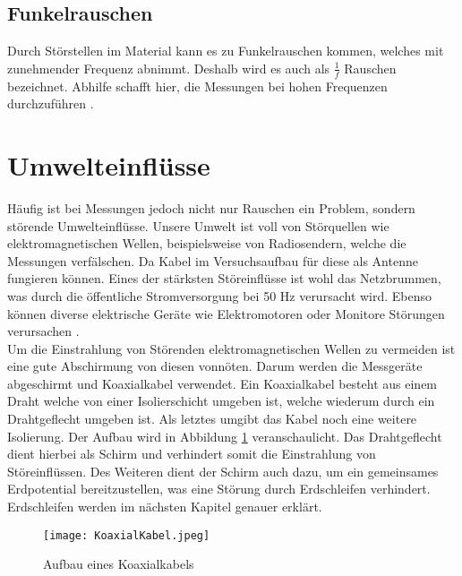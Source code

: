 \subsection{Funkelrauschen}
Durch Störstellen im Material kann es zu Funkelrauschen kommen, welches mit zunehmender Frequenz abnimmt. Deshalb wird es auch als $\frac{1}{f}$ Rauschen bezeichnet. Abhilfe schafft hier, die Messungen bei hohen Frequenzen durchzuführen \citep{VA}.

\newpage
\section{Umwelteinflüsse}
\label{sec:umwelt}
Häufig ist bei Messungen jedoch nicht nur Rauschen ein Problem, sondern störende Umwelteinflüsse. Unsere Umwelt ist voll von Störquellen wie elektromagnetischen Wellen, beispielsweise von Radiosendern, welche die Messungen verfälschen. Da Kabel im Versuchsaufbau für diese als Antenne fungieren können. Eines der stärksten Störeinflüsse ist wohl das Netzbrummen, was durch die öffentliche Stromversorgung bei 50 Hz verursacht wird. Ebenso können diverse elektrische Geräte wie Elektromotoren oder Monitore Störungen verursachen \citep{VA}.\\

Um die Einstrahlung von Störenden elektromagnetischen Wellen zu vermeiden ist eine gute Abschirmung von diesen vonnöten.
Darum werden die Messgeräte abgeschirmt und Koaxialkabel verwendet. Ein Koaxialkabel besteht aus einem Draht welche von einer Isolierschicht umgeben ist, welche wiederum durch ein Drahtgeflecht umgeben ist. Als letztes umgibt das Kabel noch eine weitere Isolierung. Der Aufbau wird in Abbildung \ref{fig:Koaxialkabel} veranschaulicht. Das Drahtgeflecht dient hierbei als Schirm und verhindert somit die Einstrahlung von Störeinflüssen. Des Weiteren dient der Schirm auch dazu, um ein gemeinsames Erdpotential bereitzustellen, was eine Störung durch Erdschleifen verhindert. Erdschleifen werden im nächsten Kapitel genauer erklärt.

\begin{figure}[h]
    \centering
    \texttt{[image: KoaxialKabel.jpeg]}
    \caption{Aufbau eines Koaxialkabels \citep{VA}}
    \label{fig:Koaxialkabel}
\end{figure}

\newpage
